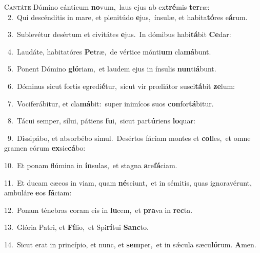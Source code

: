 \lettrine{\initial\textcolor{\initialcolor}{C}}{antáte} Dómino cánticum \textbf{no}\-vum,~\star laus ejus ab ex\-\textbf{tré}\-mis \textbf{ter}\-ræ:\\
{\numbfont\textcolor{\numbcolor}{~2.}}~Qui descénditis in mare, et plenitúdo \textbf{e}\-jus,~\star ínsulæ, et habita\-\textbf{tó}\-res e\-\textbf{á}\-rum.\par
{\numbfont\textcolor{\numbcolor}{~3.}}~Sublevétur desértum et civitátes \textbf{e}\-jus.~\star In dómibus habi\-\textbf{tá}\-bit \textbf{Ce}\-dar:\par
{\numbfont\textcolor{\numbcolor}{~4.}}~Laudáte, habitatóres \textbf{Pe}\-træ,~\star de vértice mónti\textbf{um} cla\-\textbf{má}\-bunt.\par
{\numbfont\textcolor{\numbcolor}{~5.}}~Ponent Dómino \textbf{gló}\-riam,~\star et laudem ejus in ínsulis \textbf{nun}\-ti\-\textbf{á}\-bunt.\par
{\numbfont\textcolor{\numbcolor}{~6.}}~Dóminus sicut fortis egredi\-\textbf{é}\-tur,~\star sicut vir prœliátor susci\-\textbf{tá}\-bit \textbf{ze}\-lum:\par
{\numbfont\textcolor{\numbcolor}{~7.}}~Vociferábitur, et cla\-\textbf{má}\-bit:~\star super inimícos suos \textbf{con}\-for\-\textbf{tá}\-bitur.\par
{\numbfont\textcolor{\numbcolor}{~8.}}~Tácui semper, sílui, pátiens \textbf{fu}\-i,~\star sicut par\-\textbf{tú}\-riens \textbf{lo}\-quar:\par
{\numbfont\textcolor{\numbcolor}{~9.}}~Dissipábo, et absorbébo simul.~\dagger Desértos fáciam montes et \textbf{col}\-les,~\star et omne gramen eórum \textbf{ex}\-sic\-\textbf{cá}\-bo:\par
{\numbfont\textcolor{\numbcolor}{10.}}~Et ponam flúmina in \textbf{ín}\-sulas,~\star et stagna \textbf{a}\-re\-\textbf{fá}\-ciam.\par
{\numbfont\textcolor{\numbcolor}{11.}}~Et ducam cæcos in viam, quam \textbf{né}\-sciunt,~\star et in sémitis, quas ignoravérunt, ambuláre \textbf{e}\-os \textbf{fá}\-ciam:\par
{\numbfont\textcolor{\numbcolor}{12.}}~Ponam ténebras coram eis in \textbf{lu}\-cem,~\star et \textbf{pra}\-va in \textbf{rec}\-ta.\par
{\numbfont\textcolor{\numbcolor}{13.}}~Glória Patri, et \textbf{Fí}\-lio,~\star et Spi\-\textbf{rí}\-tui \textbf{Sanc}\-to.\par
{\numbfont\textcolor{\numbcolor}{14.}}~Sicut erat in princípio, et nunc, et \textbf{sem}\-per,~\star et in sǽcula sæcu\-\textbf{ló}\-rum. \textbf{A}\-men.\par
